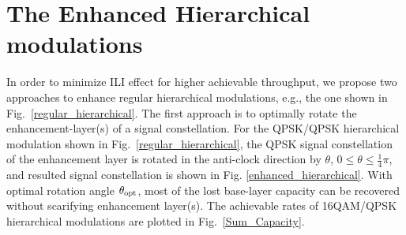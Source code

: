 \documentclass[10pt,fleqn, twocolumn]{IEEEtran}
\begin{document}
\section{The Enhanced Hierarchical modulations}
In order to minimize ILI effect for higher achievable throughput,
we propose two approaches to enhance regular hierarchical
modulations, e.g., the one shown in
Fig.~\ref{regular_hierarchical}. The first approach is to
optimally rotate the enhancement-layer(s) of a signal
constellation. For the QPSK/QPSK hierarchical modulation shown in
Fig.~\ref{regular_hierarchical}, the QPSK signal constellation of
the enhancement layer is rotated in the anti-clock direction by
$\theta$, $0\leq\theta\leq\frac{1}{4}\pi$, and resulted signal
constellation is shown in Fig. \ref{enhanced_hierarchical}. With
optimal rotation angle $\theta_{\rm opt}$, most of the lost
base-layer capacity can be recovered without scarifying
enhancement layer(s). The achievable rates of 16QAM/QPSK
hierarchical modulations are plotted in Fig.~\ref{Sum_Capacity}.
\begin{figure}
\end{figure}
\end{document}
